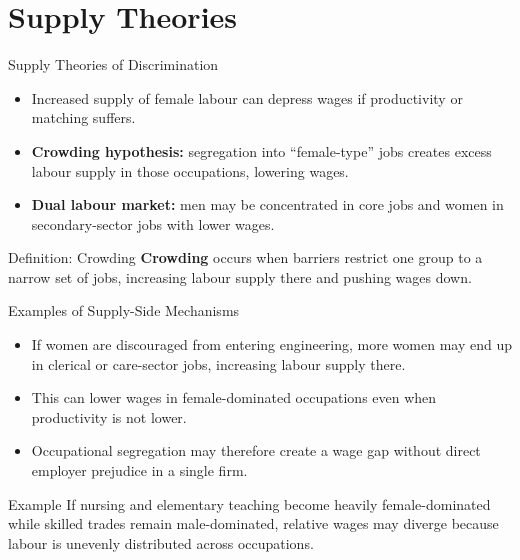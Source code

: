 \documentclass[aspectratio=169]{beamer}
\begin{document}
\section{Supply Theories}

\begin{frame}{Supply Theories of Discrimination}
\transfade
\begin{itemize}
  \item Increased supply of female labour can depress wages if productivity or matching suffers.
  \item \textbf{Crowding hypothesis:} segregation into ``female-type'' jobs creates excess labour supply in those occupations, lowering wages.
  \item \textbf{Dual labour market:} men may be concentrated in core jobs and women in secondary-sector jobs with lower wages.
\end{itemize}

\begin{block}{Definition: Crowding}
\textbf{Crowding} occurs when barriers restrict one group to a narrow set of jobs, increasing labour supply there and pushing wages down.
\end{block}
\end{frame}

\begin{frame}{Examples of Supply-Side Mechanisms}
\transfade
\begin{itemize}
  \item If women are discouraged from entering engineering, more women may end up in clerical or care-sector jobs, increasing labour supply there.
  \item This can lower wages in female-dominated occupations even when productivity is not lower.
  \item Occupational segregation may therefore create a wage gap without direct employer prejudice in a single firm.
\end{itemize}

\begin{exampleblock}{Example}
If nursing and elementary teaching become heavily female-dominated while skilled trades remain male-dominated, relative wages may diverge because labour is unevenly distributed across occupations.
\end{exampleblock}
\end{frame}
\end{document}
